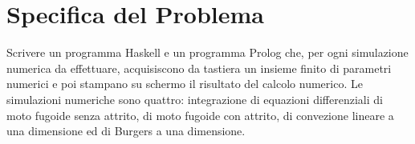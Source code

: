 \section{Specifica del Problema}

Scrivere un programma Haskell e un programma Prolog che, per ogni simulazione numerica da effettuare, acquisiscono da tastiera un insieme finito di parametri numerici e poi stampano su schermo il risultato del calcolo numerico. Le simulazioni numeriche sono quattro: integrazione di equazioni differenziali di moto fugoide senza attrito, di moto fugoide con attrito, di convezione lineare a una dimensione ed di Burgers a una dimensione. 
